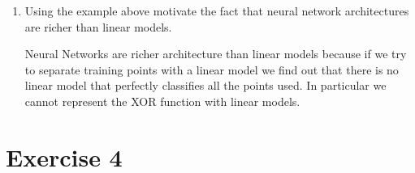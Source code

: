 \documentclass[a4paper,11pt,oneside]{book}
\begin{document}
\begin{enumerate}
        \item Using the example above motivate the fact that neural network architectures are richer than linear models.
            \begin{solution}
                Neural Networks are richer architecture than linear models because if we try to separate training points with a linear model we find out that there is no linear model that perfectly classifies all the points used. In particular we cannot represent the XOR function with linear models.
            \end{solution}
    \end{enumerate}

\clearpage
\section{Exercise 4}
\end{document}
